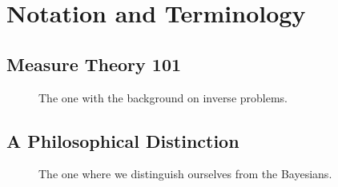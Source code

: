 



\section{Notation and Terminology}


\subsection{Measure Theory 101}

\begin{frame}[t]
\centering
\begin{figure}
\centering

The one with the background on inverse problems.

\end{figure}

\end{frame}


\subsection{A Philosophical Distinction}

\begin{frame}[t]
\centering
\begin{figure}
\centering

The one where we distinguish ourselves from the Bayesians.

\end{figure}

\end{frame}

